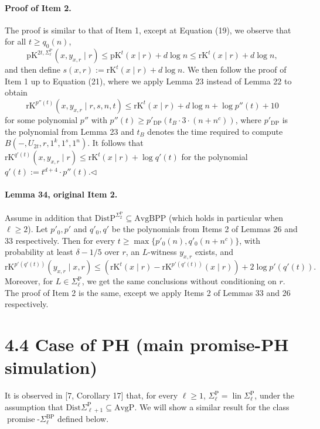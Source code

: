 \documentclass[10pt,a4paper]{article}
\begin{document}
\paragraph{Proof of Item 2.} The proof is similar to that of Item 1, except at Equation (19), we observe that for all $t\geq q_0(n)$,
\[\mathrm{pK}^{2t,\Sigma_\ell^{\mathrm P}}(x,y_{x,r}\mid r)\leq\mathrm{pK}^t(x\mid r)+d\log n\leq\mathrm{rK}^t(x\mid r)+d\log n,\]
and then define $s(x,r):=\mathrm{rK}^t(x\mid r)+d\log n$. We then follow the proof of Item 1 up to Equation (21), where we apply Lemma 23 instead of Lemma 22 to obtain
\[\mathrm{rK}^{p''(t)}(x,y_{x,r}\mid r,s,n,t)\leq\mathrm{rK}^t(x\mid r)+d\log n+\log p''(t)+10\]
for some polynomial $p''$ with $p''(t)\geq p'_{\mathrm{DP}}(t_B\cdot3\cdot(n+n^c))$, where $p'_{\mathrm{DP}}$ is the polynomial from Lemma 23 and $t_B$ denotes the time required to compute $B(-,U_{2t},r,1^k,1^s,1^n)$. It follows that $\mathrm{rK}^{q'(t)}(x,y_{x,r}\mid r)\leq\mathrm{rK}^t(x\mid r)+\log q'(t)$ for the polynomial $q'(t):=t^{d+4}\cdot p''(t)$.\hfill$\triangleleft$
\paragraph{Lemma 34, original Item 2.} Assume in addition that $\mathrm{DistP}^{\Sigma_2^{\mathrm P}}\subseteq\mathrm{AvgBPP}$ (which holds in particular when $\ell\geq2$). Let $p'_0,p'$ and $q'_0,q'$ be the polynomials from Items 2 of Lemmas 26 and 33 respectively. Then for every $t\geq\max\{p'_0(n),q'_0(n+n^c)\}$, with probability at least $\delta-1/5$ over $r$, an $L$-witness $y_{x,r}$ exists, and
\[\mathrm{rK}^{p'(q'(t))}(y_{x,r}\mid x,r)\leq(\mathrm{rK}^t(x\mid r)-\mathrm{rK}^{p'(q'(t))}(x\mid r))+2\log p'(q'(t)).\]
Moreover, for $L\in\Sigma_\ell^{\mathrm P}$, we get the same conclusions without conditioning on $r$.
The proof of Item 2 is the same, except we apply Items 2 of Lemmas 33 and 26 respectively.

\section*{4.4 Case of PH (main promise-PH simulation)}
It is observed in [7, Corollary 17] that, for every $\ell\geq1$, $\Sigma_\ell^{\mathrm P}=\operatorname{lin}\Sigma_\ell^{\mathrm P}$, under the assumption that $\mathrm{Dist}\Sigma_{\ell+1}^{\mathrm P}\subseteq\mathrm{AvgP}$. We will show a similar result for the class $\operatorname{promise}\text{-}\Sigma_\ell^{\mathrm{BP}}$ defined below.
\end{document}
